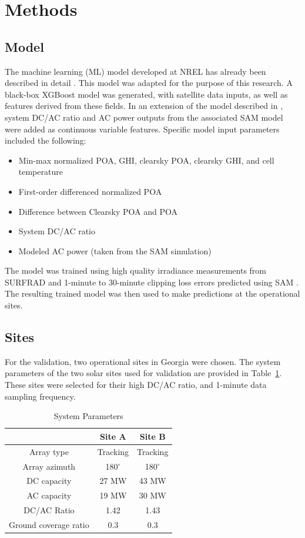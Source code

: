 \documentclass[conference]{IEEEtran}
\begin{document}
\section{Methods}

\subsection{Model}

The machine learning (ML) model developed at NREL has already been described in detail \cite{Anderson2020}. This model was adapted for the purpose of this research. A black-box XGBoost model was generated, with satellite data inputs, as well as features derived from these fields. In an extension of the model described in \cite{Anderson2020}, system DC/AC ratio and AC power outputs from the associated SAM model were added as continuous variable features. Specific model input parameters included the following:
\begin{itemize}
\item Min-max normalized POA, GHI, clearsky POA, clearsky GHI, and cell temperature
\item First-order differenced normalized POA
\item Difference between Clearsky POA and POA
\item System DC/AC ratio
\item Modeled AC power (taken from the SAM simulation) 
\end{itemize}
The model was trained using high quality irradiance measurements from SURFRAD \cite{Augustine2000} and 1-minute to 30-minute clipping loss errors predicted using SAM \cite{Freeman2018}. The resulting trained model was then used to make predictions at the operational sites.

\subsection{Sites}

For the validation, two operational sites in Georgia were chosen. The system parameters of the two solar sites used for validation are provided in Table~\ref{table1}. These sites were selected for their high DC/AC ratio, and 1-minute data sampling frequency.

\begin{table}[htbp]
\caption{System Parameters}
\begin{center}
\begin{tabular}{ |c|c|c| } 
\hline
& Site A & Site B \\
\hline
Array type & Tracking & Tracking \\
\hline
Array azimuth & 180$^{\circ}$ & 180$^{\circ}$\\
\hline
DC capacity & 27 MW & 43 MW\\
\hline
AC capacity & 19 MW & 30 MW \\
\hline
DC/AC Ratio & 1.42 & 1.43 \\
\hline
Ground coverage ratio & 0.3 & 0.3 \\
\hline
\end{tabular}
\end{center}
\label{table1}
\end{table}
\end{document}
